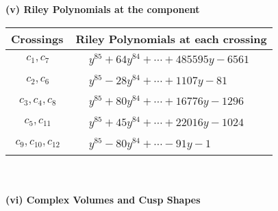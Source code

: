 \documentclass[1p]{elsarticle_modified}
\theoremstyle{definition}
\begin{document}
\newpage\renewcommand{\arraystretch}{1}
\flushleft \textbf{(v) Riley Polynomials at the component}\newline \\
\begin{tabular}{m{50pt}|m{274pt}}
Crossings & \hspace{64pt}Riley Polynomials at each crossing \\
\hline $$\begin{aligned}c_{1},c_{7}\end{aligned}$$&$\begin{aligned}
&y^{85}+64 y^{84}+\cdots+485595 y-6561
\end{aligned}$\\
\hline $$\begin{aligned}c_{2},c_{6}\end{aligned}$$&$\begin{aligned}
&y^{85}-28 y^{84}+\cdots+1107 y-81
\end{aligned}$\\
\hline $$\begin{aligned}c_{3},c_{4},c_{8}\end{aligned}$$&$\begin{aligned}
&y^{85}+80 y^{84}+\cdots+16776 y-1296
\end{aligned}$\\
\hline $$\begin{aligned}c_{5},c_{11}\end{aligned}$$&$\begin{aligned}
&y^{85}+45 y^{84}+\cdots+22016 y-1024
\end{aligned}$\\
\hline $$\begin{aligned}c_{9},c_{10},c_{12}\end{aligned}$$&$\begin{aligned}
&y^{85}-80 y^{84}+\cdots-91 y-1
\end{aligned}$\\
\hline
\end{tabular}\\~\\
\newpage\flushleft \textbf{(vi) Complex Volumes and Cusp Shapes}
\end{document}
